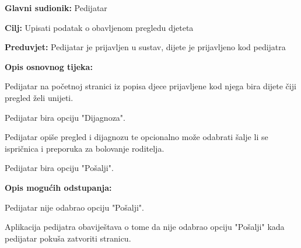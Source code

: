 					\noindent {}
					\begin{packed_item}
						
						\item \textbf{Glavni sudionik: }Pedijatar
						\item  \textbf{Cilj:} Upisati podatak o obavljenom pregledu djeteta
						\item  \textbf{Preduvjet:} Pedijatar je prijavljen u sustav, dijete je prijavljeno kod pedijatra
						\item  \textbf{Opis osnovnog tijeka:}
						
						\item[] \begin{packed_enum}
							
							\item Pedijatar na početnoj stranici iz popisa djece prijavljene kod njega bira dijete čiji pregled želi unijeti.
							\item Pedijatar bira opciju "Dijagnoza".
							\item Pedijatar opiše pregled i dijagnozu te opcionalno može odabrati šalje li se ispričnica i preporuka za bolovanje roditelja.
							\item Pedijatar bira opciju "Pošalji".
						\end{packed_enum}
						
						\item  \textbf{Opis mogućih odstupanja:}
						
						\item[] \begin{packed_item}
							
							\item[4.a] Pedijatar nije odabrao opciju "Pošalji".
							\item[] \begin{packed_enum}
								
								\item Aplikacija pedijatra obaviještava o tome da nije odabrao opciju "Pošalji" kada pedijatar pokuša zatvoriti stranicu.
							\end{packed_enum}
							
							
						\end{packed_item}
						
						
					\end{packed_item}
					
